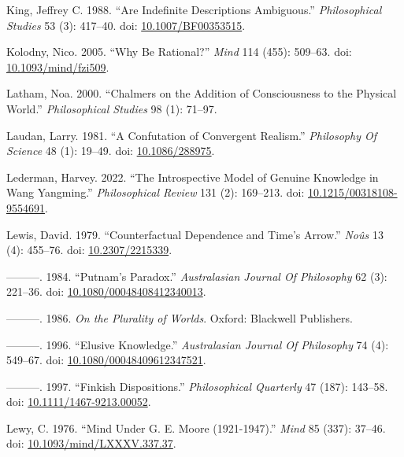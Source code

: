 \documentclass[
  10pt,
  letterpaper,
  DIV=11,
  numbers=noendperiod,
  twoside]{scrartcl}
\newlength{\cslhangindent}
\newenvironment{CSLReferences}[2] %
 {\begin{list}{}{%
  \setlength{\itemindent}{0pt}
  \setlength{\leftmargin}{0pt}
  \setlength{\parsep}{0pt}
  \ifodd #1
   \setlength{\leftmargin}{\cslhangindent}
   \setlength{\itemindent}{-1\cslhangindent}
  \fi
  \setlength{\itemsep}{#2\baselineskip}}}
 {\end{list}}
\begin{document}
\begin{CSLReferences}{1}{0}
King, Jeffrey C. 1988. {``Are Indefinite Descriptions Ambiguous.''}
\emph{Philosophical Studies} 53 (3): 417--40. doi:
\href{https://doi.org/10.1007/BF00353515}{10.1007/BF00353515}.

Kolodny, Nico. 2005. {``Why Be Rational?''} \emph{Mind} 114 (455):
509--63. doi:
\href{https://doi.org/10.1093/mind/fzi509}{10.1093/mind/fzi509}.

Latham, Noa. 2000. {``Chalmers on the Addition of Consciousness to the
Physical World.''} \emph{Philosophical Studies} 98 (1): 71--97.

Laudan, Larry. 1981. {``A Confutation of Convergent Realism.''}
\emph{Philosophy Of Science} 48 (1): 19--49. doi:
\href{https://doi.org/10.1086/288975}{10.1086/288975}.

Lederman, Harvey. 2022. {``The Introspective Model of Genuine Knowledge
in Wang Yangming.''} \emph{Philosophical Review} 131 (2): 169--213. doi:
\href{https://doi.org/10.1215/00318108-9554691}{10.1215/00318108-9554691}.

Lewis, David. 1979. {``Counterfactual Dependence and Time's Arrow.''}
\emph{Noûs} 13 (4): 455--76. doi:
\href{https://doi.org/10.2307/2215339}{10.2307/2215339}.

---------. 1984. {``Putnam's Paradox.''} \emph{Australasian Journal Of
Philosophy} 62 (3): 221--36. doi:
\href{https://doi.org/10.1080/00048408412340013}{10.1080/00048408412340013}.

---------. 1986. \emph{On the Plurality of Worlds}. Oxford: Blackwell
Publishers.

---------. 1996. {``Elusive Knowledge.''} \emph{Australasian Journal Of
Philosophy} 74 (4): 549--67. doi:
\href{https://doi.org/10.1080/00048409612347521}{10.1080/00048409612347521}.

---------. 1997. {``Finkish Dispositions.''} \emph{Philosophical
Quarterly} 47 (187): 143--58. doi:
\href{https://doi.org/10.1111/1467-9213.00052}{10.1111/1467-9213.00052}.

Lewy, C. 1976. {``Mind Under {G. E. Moore} (1921-1947).''} \emph{Mind}
85 (337): 37--46. doi:
\href{https://doi.org/10.1093/mind/LXXXV.337.37}{10.1093/mind/LXXXV.337.37}.


\end{CSLReferences}
\end{document}
